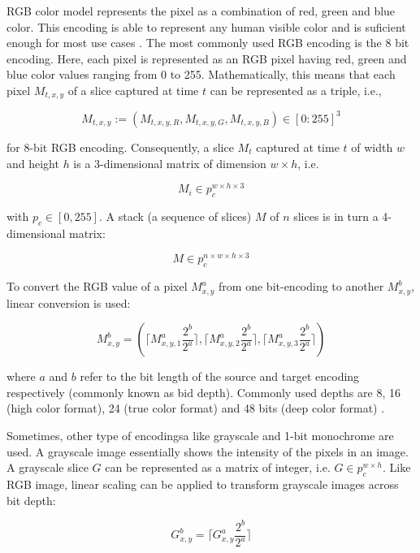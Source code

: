 \documentclass[pdftex,12pt,a4paper]{report}
\begin{document}
RGB color model represents the pixel as a combination of red, green and blue color. This encoding is able to represent any human visible color and is suficient enough for most use cases \cite{sonka2014image, jayant1993signal}. The most commonly used RGB encoding is the 8 bit encoding. Here, each pixel is represented as an RGB pixel having red, green and blue color values ranging from 0 to 255. Mathematically, this means that each pixel $M_{t,x,y}$ of a slice captured at time $t$ can be represented as a triple, i.e.,

\begin{equation}
\label{equation:rgb_pixel_def}
M_{t, x, y} := (M_{t, x, y, R}, M_{t, x, y, G}, M_{t, x, y, B}) \in [0:255]^3
\end{equation}

for 8-bit RGB encoding. Consequently, a slice $M_t$ captured at time $t$ of width $w$ and height $h$ is a 3-dimensional matrix of dimension $w \times h$, i.e.

$$
M_i \in p_c^{w \times h \times 3}
$$ 

with $p_c \in [0,255]$. A stack (a sequence of slices) $M$ of $n$ slices is in turn a 4-dimensional matrix:

$$
M \in p_c^{n \times w \times h \times 3}
$$ 

To convert the RGB value of a pixel $M^a_{x,y}$ from one bit-encoding to another $M^b_{x,y}$, linear conversion is used:

\begin{equation}
\label{equation:linear_conv_rgb}
M^b_{x,y} = (\lceil M^a_{x,y, 1} \frac{2^b}{2^a} \rceil, \lceil M^a_{x,y, 2} \frac{2^b}{2^a} \rceil, \lceil M^a_{x,y, 3} \frac{2^b}{2^a} \rceil)
\end{equation}

where $a$ and $b$ refer to the bit length of the source and target encoding respectively (commonly known as bid depth).  Commonly used depths are 8, 16 (high color format), 24 (true color format) and 48 bits (deep color format) \cite{lim1990two, sharma1997digital, sullivan2012overview}.

Sometimes, other type of encodingsa like grayscale and 1-bit monochrome are used. A grayscale image essentially shows the intensity of the pixels in an image. A grayscale slice $G$ can be represented as a matrix of integer, i.e. $G \in p_c^{w \times h}$. Like RGB image, linear scaling can be applied to transform grayscale images across bit depth:

\begin{equation}
\label{equation:linear_conv_gray}
G^b_{x,y} = \lceil G^a_{x,y} \frac{2^b}{2^a} \rceil
\end{equation}
\end{document}

